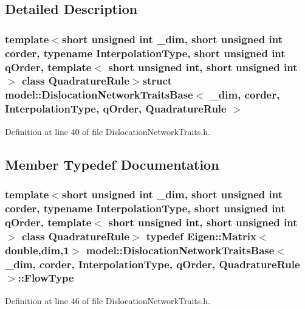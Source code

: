 \subsection{Detailed Description}
\subsubsection*{template$<$short unsigned int \+\_\+dim, short unsigned int corder, typename Interpolation\+Type, short unsigned int q\+Order, template$<$ short unsigned int, short unsigned int $>$ class Quadrature\+Rule$>$struct model\+::\+Dislocation\+Network\+Traits\+Base$<$ \+\_\+dim, corder, Interpolation\+Type, q\+Order, Quadrature\+Rule $>$}



Definition at line 40 of file Dislocation\+Network\+Traits.\+h.



\subsection{Member Typedef Documentation}
\hypertarget{structmodel_1_1_dislocation_network_traits_base_ac676e7afc348be370687f06de004e062}{}
\subsubsection[{Flow\+Type}]{\setlength{\rightskip}{0pt plus 5cm}template$<$short unsigned int \+\_\+dim, short unsigned int corder, typename Interpolation\+Type, short unsigned int q\+Order, template$<$ short unsigned int, short unsigned int $>$ class Quadrature\+Rule$>$ typedef Eigen\+::\+Matrix$<$double,{\bf dim},1$>$ {\bf model\+::\+Dislocation\+Network\+Traits\+Base}$<$ \+\_\+dim, corder, Interpolation\+Type, q\+Order, Quadrature\+Rule $>$\+::{\bf Flow\+Type}}\label{structmodel_1_1_dislocation_network_traits_base_ac676e7afc348be370687f06de004e062}


Definition at line 46 of file Dislocation\+Network\+Traits.\+h.

\hypertarget{structmodel_1_1_dislocation_network_traits_base_abf174d97083b39a2071a69f1dc5d079c}{}
